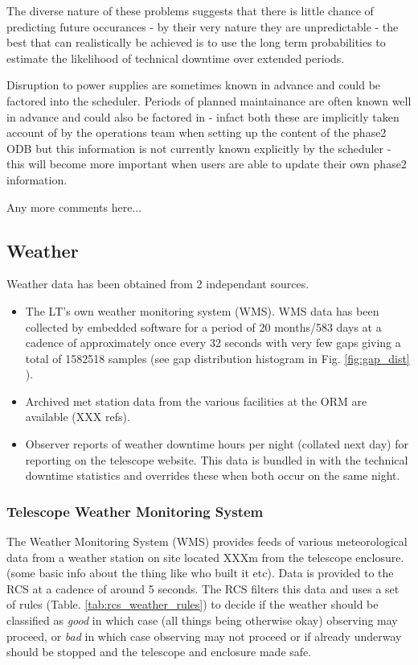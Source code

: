 The diverse nature of these problems suggests that there is little chance of predicting future occurances - by their very nature they are unpredictable - the best that can realistically be achieved is to use the long term probabilities to estimate the likelihood of technical downtime over extended periods. 

Disruption to power supplies are sometimes known in advance and could be factored into the scheduler. Periods of planned maintainance are often known well in advance and could also be factored in - infact both these are implicitly taken account of by the operations team when setting up the content of the phase2 ODB but this information is not currently known explicitly by the scheduler - this will become more important when users are able to update their own phase2 information.

Any more comments here...

\subsection{Weather}
Weather data has been obtained from 2 independant sources.
\begin{itemize}
\item The LT's own weather monitoring system (WMS). WMS data has been collected by embedded software for a period of 20 months/583 days at a cadence of approximately once every 32 seconds with very few gaps giving a total of 1582518 samples (see gap distribution histogram in Fig. \ref{fig:gap_dist} ).
\item Archived met station data from the various facilities at the ORM are available (XXX refs).
\item Observer reports of weather downtime hours per night (collated next day) for reporting on the telescope website. This data is bundled in with the technical downtime statistics and overrides these when both occur on the same night.
\end{itemize}


\subsubsection{Telescope Weather Monitoring System}
 The Weather Monitoring System (WMS) provides feeds of various meteorological data from a weather station on site located XXXm from the telescope enclosure. (some basic info about the thing like who built it etc). Data is provided to the RCS at a cadence of around 5 seconds. The RCS filters this data and uses a set of rules (Table. \ref{tab:rcs_weather_rules}) to decide if the weather should be classified as \emph{good} in which case (all things being otherwise okay) observing may proceed, or \emph{bad} in which case observing may not proceed or if already underway should be stopped and the telescope and enclosure made safe.

